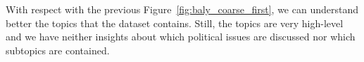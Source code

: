 
With respect with the previous Figure~\ref{fig:baly_coarse_first}, we can understand better the topics that the dataset contains.
Still, the topics are very high-level and we have neither insights about which political issues are discussed nor which subtopics are contained.









